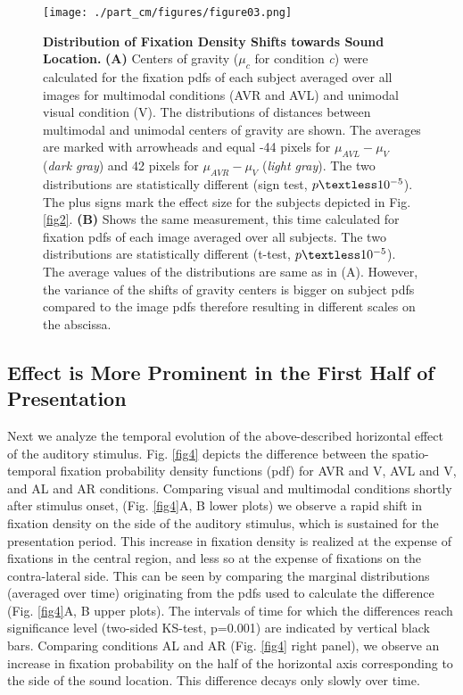 \begin{figure}[!htbp] \centerline{ \texttt{[image: ./part\_cm/figures/figure03.png]}}
\caption[Distribution of Fixation Density Shifts towards Sound Location.]{
\textbf{Distribution of Fixation Density Shifts towards Sound Location.}
\textbf{(A)} Centers of gravity ($\mu_{c}$ for condition \textit{c}) were
calculated for the fixation pdfs of each subject averaged over all images
for multimodal conditions (AVR and AVL) and unimodal visual condition (V).
The distributions of distances between multimodal and unimodal centers of
gravity are shown. The averages are marked with arrowheads and equal -44
pixels for $\mu_{AVL}-\mu_{V}$ (\textit{dark gray}) and 42 pixels for
$\mu_{AVR}-\mu_{V}$ (\textit{light gray}). The two distributions are
statistically different (sign test, $p \textless 10^{-5}$). The plus signs
mark the effect size for the subjects depicted in Fig. \ref{fig2}.
\textbf{(B)} Shows the same measurement, this time calculated for fixation
pdfs of each image averaged over all subjects. The two distributions are
statistically different (t-test, $p \textless 10^{-5}$). The average values
of the distributions are same as in (A). However, the variance of the
shifts of gravity centers is bigger on subject pdfs compared to the image
pdfs therefore resulting in different scales on the abscissa.}
\label{fig3}\end{figure}

\subsection{Effect is More Prominent in the First Half of Presentation}

Next we analyze the temporal evolution of the above-described horizontal
effect of the auditory stimulus. Fig. \ref{fig4} depicts the difference between
the spatio-temporal fixation probability density functions (pdf) for AVR
and V, AVL and V, and AL and AR conditions. Comparing visual and multimodal
conditions shortly after stimulus onset, (Fig. \ref{fig4}A, B lower plots) we
observe a rapid shift in fixation density on the side of the auditory
stimulus, which is sustained for the presentation period. This increase in
fixation density is realized at the expense of fixations in the central
region, and less so at the expense of fixations on the contra-lateral side.
This can be seen by comparing the marginal distributions (averaged over
time) originating from the pdfs used to calculate \newpage the difference
(Fig. \ref{fig4}A, B upper plots). The intervals of time for which the
differences reach significance level (two-sided KS-test, p=0.001) are
indicated by vertical black bars. Comparing conditions AL and AR
(Fig. \ref{fig4} right panel), we observe an increase in fixation probability on
the half of the horizontal axis corresponding to the side of the sound
location. This difference decays only slowly over time. 


